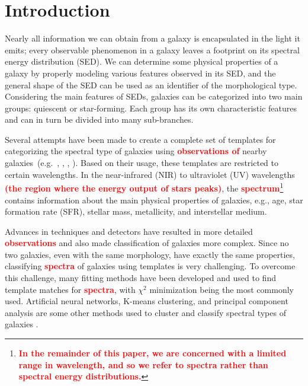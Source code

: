 \section{Introduction}
\label{sec: intro_somz}
Nearly all information we can obtain from a galaxy is encapsulated in the light it emits; every observable phenomenon in a galaxy leaves a footprint on its spectral energy distribution (SED).
We can determine some physical properties of a galaxy by properly modeling various features observed in its SED, and the general shape of the SED can be used as an identifier of the morphological type.
Considering the main features of SEDs, galaxies can be categorized into two main groups: quiescent or star-forming.
Each group has its own characteristic features and can in turn be divided into many sub-branches.

Several attempts have been made to create a complete set of templates for categorizing the spectral type of galaxies using \textbf{\textcolor{red}{observations of}} nearby galaxies~(e.g.~\citealt{Kinney93}, \citealt[][hereafter ]{Kinney96}, \citealt{Bershady00}, \citealt{Mannucci01}). 
Based on their usage, these templates are restricted to certain wavelengths.
In the near-infrared (NIR) to ultraviolet (UV) wavelengths \textbf{\textcolor{red}{(the region where the energy output of stars peaks)}}, the \textbf{\textcolor{red}{spectrum}}\footnote{\textbf{\textcolor{red}{In the remainder of this paper, we are concerned with a limited range in wavelength, and so we refer to spectra rather than spectral energy distributions.}}} contains information about the main physical properties of galaxies, e.g., age, star formation rate (SFR), stellar mass, metallicity, and interstellar medium. 



Advances in techniques and detectors have resulted in more detailed \textbf{\textcolor{red}{observations}} and also made classification of galaxies more complex.
Since no two galaxies, even with the same morphology, have exactly the same properties, classifying \textbf{\textcolor{red}{spectra}} of galaxies using templates is very challenging.
To overcome this challenge, many fitting methods have been developed and used to find template matches for \textbf{\textcolor{red}{spectra}}, with $\chi^2$ minimization being the most commonly used. 
Artificial neural networks, K-means clustering, and principal component analysis are some other methods used to cluster and classify spectral types of galaxies \citep[e.g.][]{Allen13,Ordov14,Shi15}.

